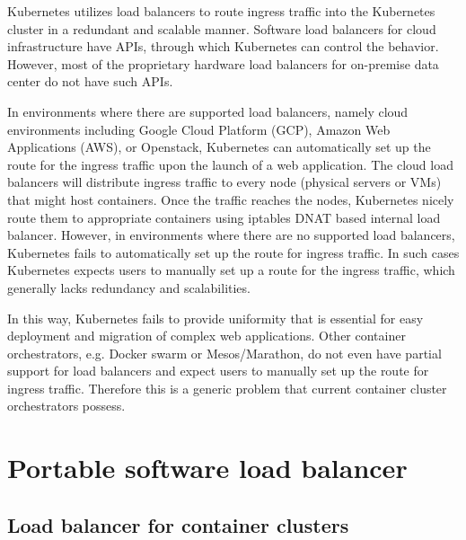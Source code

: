 Kubernetes utilizes load balancers to route ingress traffic into the Kubernetes cluster in a redundant and scalable manner. 
Software load balancers for cloud infrastructure have APIs, through which Kubernetes can control the behavior.
However, most of the proprietary hardware load balancers for on-premise data center do not have such APIs.

In environments where there are supported load balancers, namely cloud environments including Google Cloud Platform (GCP), Amazon Web Applications (AWS), or Openstack, Kubernetes can automatically set up the route for the ingress traffic upon the launch of a web application.
The cloud load balancers will distribute ingress traffic to every node (physical servers or VMs) that might host containers.
Once the traffic reaches the nodes, Kubernetes nicely route them to appropriate containers using iptables DNAT based internal load balancer.
%
However, in environments where there are no supported load balancers, Kubernetes fails to automatically set up the route for ingress traffic.
In such cases Kubernetes expects users to manually set up a route for the ingress traffic, which generally lacks redundancy and scalabilities.

In this way, Kubernetes fails to provide uniformity that is essential for easy deployment and migration of complex web applications.
Other container orchestrators, e.g. Docker swarm or Mesos/Marathon, do not even have partial support for load balancers and expect users to manually set up the route for ingress traffic.
Therefore this is a generic problem that current container cluster orchestrators possess.

\section{Portable software load balancer}

\subsection{Load balancer for container clusters}

